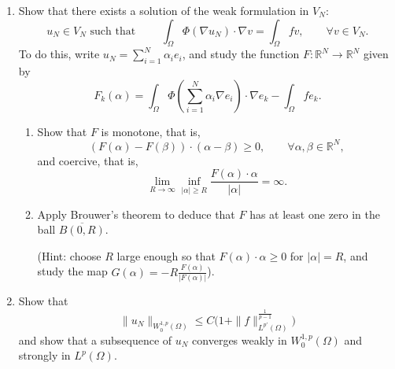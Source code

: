 \begin{example}
\begin{enumerate}
        \item 	Show that there exists a solution of the weak formulation in $V_N$:
              \begin{equation}
                  \label{eq:Galerkin weak}
                  u_N \in V_N \text{ such that } \qquad \int_\Omega \Phi(\nabla u_N) \cdot \nabla v = \int_\Omega f v, \qquad 	\forall v \in V_N.
              \end{equation}
              To do this, write $u_N = \sum_{i=1}^N  \alpha_i e_i$, and study the function $F: \mathbb R^N \to \mathbb R^N$ given by
              \begin{equation*}
                  F_k (\alpha) = \int_\Omega \Phi\left(\sum_{i=1}^N \alpha_i \nabla e_i\right) \cdot \nabla e_k - \int_\Omega f e_k.
              \end{equation*}
              \begin{enumerate}
                  \item Show that $F$ is monotone, that is,
                        \begin{equation*}
                            (F(\alpha) - F(\beta)) \cdot (\alpha - \beta) \ge 0, \qquad \forall \alpha, \beta \in \mathbb R^N,
                        \end{equation*}
                        and coercive, that is,
                        $$
                            \lim_{R\to \infty} \inf_{|\alpha| \ge R}\frac{ F(\alpha) \cdot \alpha }{ | \alpha | } = \infty.
                        $$

                  \item Apply Brouwer's theorem to deduce that $F$ has at least one zero in the ball $\overline{B(0,R)}$.

                        (Hint: choose $R$ large enough so that $F(\alpha) \cdot \alpha \ge 0$ for $|\alpha| = R$, and study the map $G (\alpha) = - R \frac{F(\alpha)}{|F(\alpha)|}$).


              \end{enumerate}

        \item 	Show that
              \begin{equation*}
                  \| u_N \|_{W_0^{1,p}(\Omega)}  \le C \big(1 + \| f \|_{L^{p'}(\Omega)}^{\frac{1}{p-1}}\big)
              \end{equation*}
              and show that a subsequence of $u_N$ converges weakly in $W_0^{1,p}(\Omega)$ and strongly in $L^p (\Omega)$.


\end{enumerate}
\end{example}
